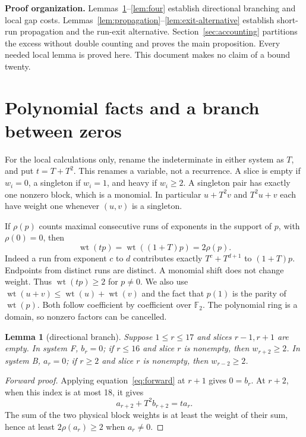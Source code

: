 \documentclass{article}
\newtheorem{lemma}{Lemma}
\DeclareMathOperator{\wt}{wt}
\begin{document}
\textbf{Proof organization.} Lemmas~\ref{lem:branch}--\ref{lem:four} establish directional
branching and local gap costs. Lemmas~\ref{lem:propagation}--\ref{lem:exit-alternative} establish
short-run propagation and the run-exit alternative. Section~\ref{sec:accounting} partitions the
excess without double counting and proves the main proposition. Every needed local lemma is
proved here. This document makes no claim of a bound twenty.

\section{Polynomial facts and a branch between zeros}\label{sec:polynomial}

For the local calculations only, rename the indeterminate in either system as \(T\), and put
\(t = T + T^2\). This renames a variable, not a recurrence. A slice is empty if \(w_i = 0\), a
singleton if \(w_i = 1\), and heavy if \(w_i \ge 2\). A singleton pair has exactly one
nonzero block, which is a monomial. In particular \(u + T^2 v\) and \(T^2 u + v\) each have weight
one whenever \((u,v)\) is a singleton.

If \(\rho(p)\) counts maximal consecutive runs of exponents in the support of \(p\), with
\(\rho(0) = 0\), then
\begin{equation}\label{eq:runs}
  \wt(tp) = \wt((1 + T)p) = 2\rho(p).
\end{equation}
Indeed a run from exponent \(c\) to \(d\) contributes exactly \(T^c + T^{d+1}\) to \((1 + T)p\).
Endpoints from distinct runs are distinct. A monomial shift does not change weight. Thus
\(\wt(tp) \ge 2\) for \(p \ne 0\). We also use \(\wt(u + v) \le \wt(u) + \wt(v)\) and the fact
that \(p(1)\) is the parity of \(\wt(p)\). Both follow coefficient by coefficient over
\(\mathbb{F}_2\). The polynomial ring is a domain, so nonzero factors can be cancelled.

\begin{lemma}[directional branch]\label{lem:branch}
  Suppose \(1 \le r \le 17\) and slices \(r - 1, r + 1\) are empty. In system F, \(b_r = 0\); if
  \(r \le 16\) and slice \(r\) is nonempty, then \(w_{r+2} \ge 2\). In system B, \(a_r = 0\); if
  \(r \ge 2\) and slice \(r\) is nonempty, then \(w_{r-2} \ge 2\).
\end{lemma}

\begin{proof}[Forward proof]
  Applying equation~\eqref{eq:forward} at \(r + 1\) gives \(0 = b_r\). At \(r + 2\), when this
  index is at most 18, it gives
  \begin{equation}
    a_{r+2} + T^2 b_{r+2} = t a_r.
  \end{equation}
  The sum of the two physical block weights is at least the weight of their sum, hence at least
  \(2\rho(a_r) \ge 2\) when \(a_r \ne 0\).
\end{proof}
\end{document}
